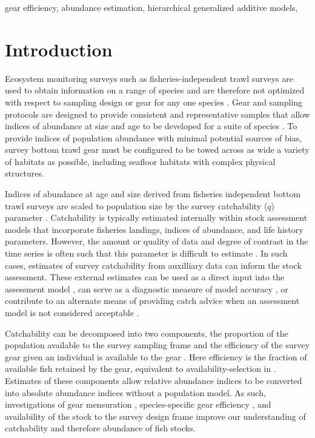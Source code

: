 \documentclass[
  12pt,
]{article}
\begin{document}
gear efficiency, abundance estimation, hierarchical generalized additive
models,

\pagebreak

\hypertarget{introduction}{%
\section{Introduction}\label{introduction}}

Ecosystem monitoring surveys such as fisheries-independent trawl surveys
are used to obtain information on a range of species and are therefore
not optimized with respect to sampling design or gear for any one
species \citep{bijleveldetal12, wangetal18}. Gear and sampling protocols
are designed to provide consistent and representative samples that allow
indices of abundance at size and age to be developed for a suite of
species \citep{azarovitz81, thiessetal18}. To provide indices of
population abundance with minimal potential sources of bias, survey
bottom trawl gear must be configured to be towed across as wide a
variety of habitats as possible, including seafloor habitats with
complex physical structures.

Indices of abundance at age and size derived from fisheries independent
bottom trawl surveys are scaled to population size by the survey
catchability (\(q\)) parameter \citep{arreguinsanchez96}. Catchability
is typically estimated internally within stock assessment models that
incorporate fisheries landings, indices of abundance, and life history
parameters. However, the amount or quality of data and degree of
contrast in the time series is often such that this parameter is
difficult to estimate \citep{maunderpiner15}. In such cases, estimates
of survey catchability from auxilliary data can inform the stock
assessment. These external estimates can be used as a direct input into
the assessment model \citep{somertonetal99}, can serve as a diagnostic
measure of model accuracy \citep{milleretal19}, or contribute to an
alternate means of providing catch advice when an assessment model is
not considered acceptable \citep{legaultmccurdy17}.

Catchability can be decomposed into two components, the proportion of
the population available to the survey sampling frame and the efficiency
of the survey gear given an individual is available to the gear
\citep{paloheimodickie64}. Here efficiency is the fraction of available
fish retained by the gear, equivalent to availability-selection in
\citet{millarfryer99}. Estimates of these components allow relative
abundance indices to be converted into absolute abundance indices
without a population model. As such, investigations of gear mensuration
\citep{kotwickietal11}, species-specific gear efficiency
\citep{thygesenetal19,jonesetal21}, and availability of the stock to the
survey design frame \citep{nicholetal19} improve our understanding of
catchability and therefore abundance of fish stocks.
\end{document}
